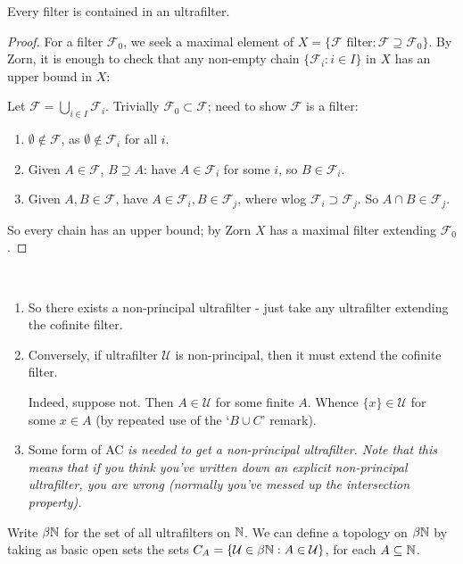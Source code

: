 \documentclass[10pt]{article}
\newcommand{\F}{\mathcal{F}}
\newcommand{\U}{\mathcal{U}}
\begin{document}
\begin{theorem}
    Every filter is contained in an ultrafilter.
\end{theorem}
\begin{proof}
    For a filter $\F_0$, we seek a maximal element of $X = \{\F\textrm{ filter}: \F\supseteq \F_0\}$. By Zorn, it is enough to check that any non-empty chain $\{\F_i:i\in I\}$ in $X$ has an upper bound in $X$:

    Let $\F = \bigcup_{i\in I}\F_i$. Trivially $\F_0 \subset \F$; need to show $\F$ is a filter:
    \begin{enumerate}[label=\roman*)]
        \item $\emptyset\not\in \F$, as $\emptyset\not\in \F_i$ for all $i$.
        \item Given $A \in \F$, $B\supseteq A$: have $A \in \F_i$ for some $i$, so $B \in \F_i$.
        \item Given $A,B\in \F$, have $A \in \F_i,B\in \F_j$, where wlog $\F_i\supset \F_j$. So $A\cap B \in \F_j$.
    \end{enumerate}
    So every chain has an upper bound; by Zorn $X$ has a maximal filter extending $\F_0$.
\end{proof}

\begin{remark*}[Remarks]\ 
    \begin{enumerate}
        \item So there exists a non-principal ultrafilter - just take any ultrafilter extending the cofinite filter.
        \item Conversely, if ultrafilter $\U$ is non-principal, then it must extend the cofinite filter.
        
        Indeed, suppose not. Then $A\in \U$ for some finite $A$. Whence $\{x\} \in \U$ for some $x \in A$ (by repeated use of the `$B\cup C$' remark).

        \item Some form of AC \it{is needed} to get a non-principal ultrafilter. Note that this means that if you think you've written down an explicit non-principal ultrafilter, you are wrong (normally you've messed up the intersection property).
    \end{enumerate}
\end{remark*}

Write $\beta\mathbb{N}$ for the set of all ultrafilters on $\mathbb{N}$. We can define a topology on $\beta\mathbb{N}$ by taking as basic open sets the sets $C_A = \{\U\in \beta\N : A\in \U\}$, for each $A\subseteq \mathbb{N}$.
\end{document}
